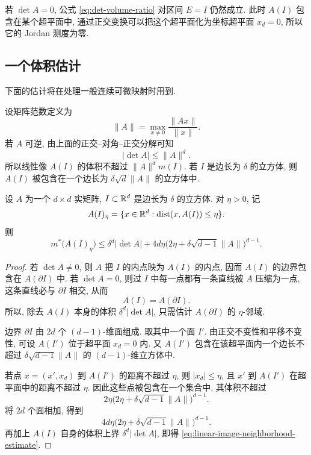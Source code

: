 若 \(\det A=0\), 公式 \eqref{eq:det-volume-ratio} 对区间 \(E=I\) 仍然成立. 此时 \(A(I)\) 包含在某个超平面中, 通过正交变换可以把这个超平面化为坐标超平面 \(x_d=0\), 所以它的 Jordan 测度为零.

\subsection{一个体积估计}

下面的估计将在处理一般连续可微映射时用到.

设矩阵范数定义为
\[
\|A\|=\max_{x\neq0}\frac{\|Ax\|}{\|x\|}.
\]
若 \(A\) 可逆, 由上面的正交--对角--正交分解可知
\[
|\det A|\leq \|A\|^d.
\]
所以线性像 \(A(I)\) 的体积不超过 \(\|A\|^d m(I)\). 若 \(I\) 是边长为 \(\delta\) 的立方体, 则 \(A(I)\) 被包含在一个边长为 \(\delta\sqrt d\|A\|\) 的立方体中.

\begin{lem}\label{lem:linear-image-neighborhood-estimate}
	设 \(A\) 为一个 \(d\times d\) 实矩阵, \(I\subset\mathbb{R}^d\) 是边长为 \(\delta\) 的立方体. 对 \(\eta>0\), 记
	\[
	A(I)_\eta=\{x\in\mathbb{R}^d:\operatorname{dist}(x,A(I))\leq \eta\}.
	\]
	则
	\begin{equation}
		m^*\bigl(A(I)_\eta\bigr)
		\leq
		\delta^d|\det A|
		+4d\eta\bigl(2\eta+\delta\sqrt{d-1}\|A\|\bigr)^{d-1}.
		\label{eq:linear-image-neighborhood-estimate}
	\end{equation}
\end{lem}

\begin{proof}
	若 \(\det A\neq0\), 则 \(A\) 把 \(I\) 的内点映为 \(A(I)\) 的内点, 因而 \(A(I)\) 的边界包含在 \(A(\partial I)\) 中. 若 \(\det A=0\), 则过 \(I\) 中每一点都有一条直线被 \(A\) 压缩为一点, 这条直线必与 \(\partial I\) 相交, 从而
	\[
	A(I)=A(\partial I).
	\]
	所以, 除去 \(A(I)\) 本身的体积 \(\delta^d|\det A|\), 只需估计 \(A(\partial I)\) 的 \(\eta\)-邻域.
	
	边界 \(\partial I\) 由 \(2d\) 个 \((d-1)\)-维面组成. 取其中一个面 \(I'\). 由正交不变性和平移不变性, 可设 \(A(I')\) 位于超平面 \(x_d=0\) 内. 又 \(A(I')\) 包含在该超平面内一个边长不超过 \(\delta\sqrt{d-1}\|A\|\) 的 \((d-1)\)-维立方体中.
	
	若点 \(x=(x',x_d)\) 到 \(A(I')\) 的距离不超过 \(\eta\), 则 \(|x_d|\leq \eta\), 且 \(x'\) 到 \(A(I')\) 在超平面中的距离不超过 \(\eta\). 因此这些点被包含在一个集合中, 其体积不超过
	\[
	2\eta\bigl(2\eta+\delta\sqrt{d-1}\|A\|\bigr)^{d-1}.
	\]
	将 \(2d\) 个面相加, 得到
	\[
	4d\eta\bigl(2\eta+\delta\sqrt{d-1}\|A\|\bigr)^{d-1}.
	\]
	再加上 \(A(I)\) 自身的体积上界 \(\delta^d|\det A|\), 即得 \eqref{eq:linear-image-neighborhood-estimate}.
\end{proof}

